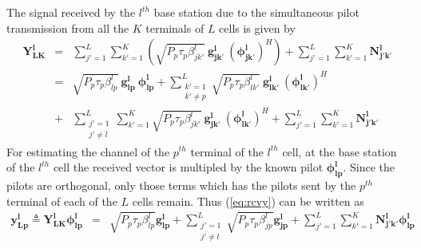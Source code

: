 \documentclass[10pt, a4paper, twoside,fleqn]{article}
\begin{document}
The signal received by the $l^{th}$ base station due to the simultaneous pilot transmission from  all the $K$ terminals of $L$ cells is given by
\begin{eqnarray}\label{eq:rcvy}
	\mathbf{Y_{LK}^{l}} &=& \sum_{j'=1}^{L} \sum_{k'=1}^{K} (\sqrt{P_p \tau_p \beta_{jk'}^{l}} \ \mathbf{g_{jk'}^{l}} \ (\mathbf{\phi_{jk'}^{l}})^H)
				+ \sum_{j'=1}^{L} \sum_{k'=1}^{K}\mathbf{N_{j'k'}^{l}} \nonumber \\
			    &=&\sqrt{P_p \tau_p \beta_{lp}^{l}} \ \mathbf{g_{lp}^{l}} \ \mathbf{\phi_{lp}^{l}}
			     + \sum_{\substack{k'=1 \\ k' \neq p}}^{L} \sqrt{P_p \tau_p \beta_{lk'}^{l}} \ \mathbf{g_{lk'}^{l}} \ (\mathbf{\phi_{lk'}^{l}}) ^H \nonumber \\
			    &+&\sum_{\substack{j'=1 \\ j' \neq l}}^{L} \sum_{k'=1}^{K} \sqrt{P_p \tau_p \beta_{jk'}^{l}} \ \mathbf{g_{jk'}^{l}} \ (\mathbf{\phi_{lk'}^{l}})^H 
			     +  \sum_{j'=1}^{L} \sum_{k'=1}^{K}\mathbf{N_{j'k'}^{l}}
\end{eqnarray}
For estimating the channel of the $p^{th}$ terminal of the $l^{th}$ cell, at the base station of the $l^{th}$ cell the received vector is multipled by the known pilot $\mathbf{\phi_{lp}^{l}}$. Since the pilots are orthogonal, only those terms which has the pilots sent by the $p^{th}$ terminal of each of the $L$ cells remain. Thus (\ref{eq:rcvy}) can be written as
\begin{eqnarray}
	\mathbf{y_{Lp}^{l}} \triangleq \mathbf{Y_{LK}^{l}} \mathbf{\phi_{lp}^{l}} 
                                &=&    \sqrt{P_p\tau_p\beta_{lp}^{l}}\mathbf{g_{lp}^{l}} 
                                 +     \sum_{\substack{j'=1 \\ j' \neq l}}^{L} \sqrt{P_p\tau_p\beta_{jp}^{l}}\mathbf{g_{jp}^{l}}
				 +     \sum_{j'=1}^{L} \sum_{k'=1}^{K}\mathbf{N_{j'k'}^{l}}\mathbf{\phi_{lp}^{l}}
\end{eqnarray}
\end{document}
